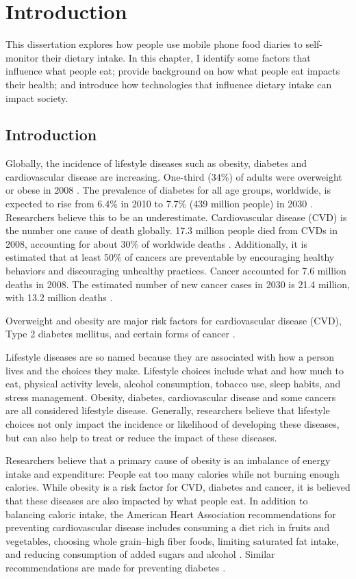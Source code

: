\chapter {Introduction}

This dissertation explores how people use mobile phone food diaries to self-monitor their dietary intake. In this chapter, I identify some factors that influence what people eat; provide background on how what people eat impacts their health; and introduce how technologies that influence dietary intake can impact society. 

\section{Introduction}
Globally, the incidence of lifestyle diseases such as obesity, diabetes and cardiovascular disease are increasing. One-third (34\%) of adults were overweight or obese in 2008 \citep{kimokoti_diet_2011}. The prevalence of diabetes for all age groups, worldwide, is expected to rise from 6.4\% in 2010 to 7.7\% (439 million people) in 2030 \citep{Shaw20104}. Researchers believe this to be an underestimate. Cardiovascular disease (CVD) is the number one cause of death globally. 17.3 million people died from CVDs in 2008, accounting for about 30\% of worldwide deaths \citep{WHO_CVD_2011}. Additionally, it is estimated that at least 50\% of cancers are preventable by encouraging healthy behaviors and discouraging unhealthy practices. Cancer accounted for 7.6 million deaths in 2008. The estimated number of new cancer cases in 2030 is 21.4 million, with 13.2 million deaths \citep{american_cancer_society_global_2011}. 

Overweight and obesity are major risk factors for cardiovascular disease (CVD), Type 2 diabetes mellitus, and certain forms of cancer \citep{guh_incidence_2009} \citep{calle_overweight_2004}. 

Lifestyle diseases are so named because they are associated with how a person lives and the choices they make. Lifestyle choices include what and how much to eat, physical activity levels, alcohol consumption, tobacco use, sleep habits, and stress management. Obesity, diabetes, cardiovascular disease and some cancers are all considered lifestyle disease. Generally, researchers believe that lifestyle choices not only impact the incidence or likelihood of developing these diseases, but can also help to treat or reduce the impact of these diseases. 

Researchers believe that a primary cause of obesity is an imbalance of energy intake and expenditure: People eat too many calories while not burning enough calories. While obesity is a risk factor for CVD, diabetes and cancer, it is believed that these diseases are also impacted by what people eat. In addition to balancing caloric intake, the American Heart Association recommendations for preventing cardiovascular disease includes consuming a diet rich in fruits and vegetables, choosing whole grain--high fiber foods, limiting saturated fat intake, and reducing consumption of added sugars and alcohol \citep{Lichtenstein2006}. Similar recommendations are made for preventing diabetes \citep{Hu2001, Thomas2012}. 

